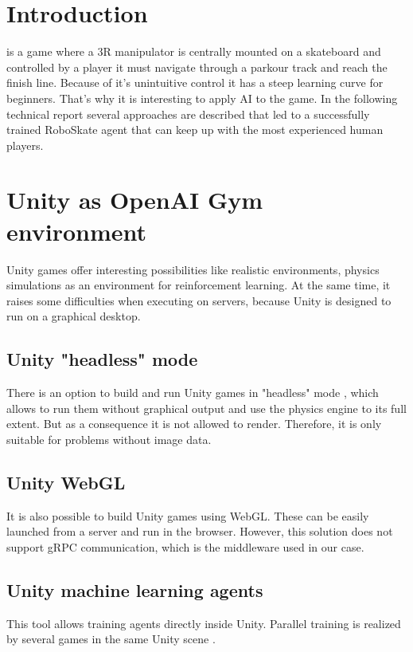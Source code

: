 \documentclass[conference]{IEEEtran}
\begin{document}

\section{Introduction}
 is a game where a 3R manipulator is centrally mounted on a skateboard \cite{RoboSkate} and controlled by a player it must navigate through a parkour track and reach the finish line. Because of it's unintuitive control it has a steep learning curve for beginners. That's why it is interesting to apply AI to the game. In the following technical report several approaches are described that led to a successfully trained RoboSkate agent that can keep up with the most experienced human players.


\section{Unity as OpenAI Gym environment}
Unity games offer interesting possibilities like realistic environments, physics simulations as an environment for reinforcement learning. At the same time, it raises some difficulties when executing on servers, because Unity is designed to run on a graphical desktop.

\subsection{Unity "headless" mode}
There is an option to build and run Unity games in "headless" mode \cite{unityHeadless}, which allows to run them without graphical output and use the physics engine to its full extent. But as a consequence it is not allowed
to render. Therefore, it is only suitable for problems without image data. 

\subsection{Unity WebGL}
It is also possible to build Unity games using WebGL. These can be easily launched from a server and run in the browser. However, this solution does not support gRPC communication, which is the middleware used in our case.

\subsection{Unity machine learning agents}
This tool allows training agents directly inside Unity. Parallel training is realized by several games in the same Unity scene \cite{unityRL}.
\end{document}
